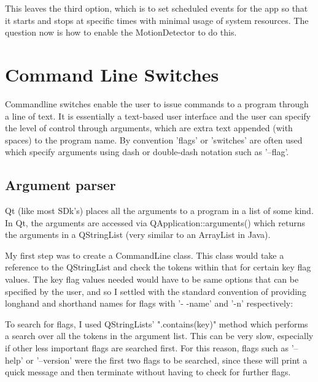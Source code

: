 \documentclass[11pt]{article} %
\begin{document}
This leaves the third option, which is to set scheduled events for the app so that it starts and stops at specific times with minimal usage of system resources. The question now is how to enable the MotionDetector to do this.

\section{Command Line Switches}

Commandline switches enable the user to issue commands to a program through a line of text. It is essentially a text-based user interface and the user can specify the level of control through arguments, which are extra text appended (with spaces) to the program name. By convention 'flags' or 'switches' are often used which specify arguments using dash or double-dash notation such as '--flag'.

\subsection{Argument parser}

Qt (like most SDk's) places all the arguments to a program in a list of some kind. In Qt, the arguments are accessed via QApplication::arguments() which returns the arguments in a QStringList (very similar to an ArrayList in Java).

My first step was to create a CommandLine class. This class would take a reference to the QStringList and check the tokens within that for certain key flag values. The key flag values needed would have to be same options that can be specified by the user, and so I settled with the standard convention of providing longhand and shorthand names for flags with '- -name' and '-n' respectively:
\begin{frame}[fragile]

\label{frame:help}
\end{frame}

To search for flags, I used QStringLists' ".contains(key)" method which performs a search over all the tokens in the argument list. This can be very slow, especially if other less important flags are searched first. 
For this reason, flags such as '--help' or '--version' were the first two flags to be searched, since these will print a quick message and then terminate without having to check for further flags.
\end{document}

